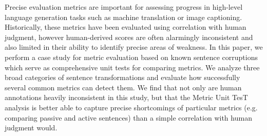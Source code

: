 Precise evaluation metrics are important for assessing progress in high-level language generation tasks such as machine translation or image captioning. Historically, these metrics have been evaluated using correlation with human judgment, however human-derived scores are often alarmingly inconsistent and also limited in their ability to identify precise areas of weakness. In this paper, we perform a case study for metric evaluation based on known sentence corruptions which serve as comprehensive unit tests for comparing metrics. We analyze three broad categories of sentence transformations and evaluate how successfully several common metrics can detect them. We find that not only are human annotations heavily inconsistent in this study, but that the Metric Unit TesT analysis is better able to capture precise shortcomings of particular metrics (e.g. comparing passive and active sentences) than a simple correlation with human judgment would.

